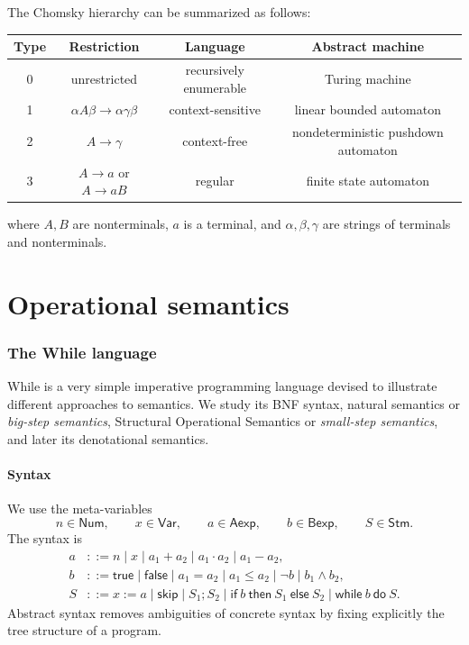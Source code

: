 \documentclass[a4paper]{article}
\newcommand{\Stm}{\mathsf{Stm}}
\newcommand{\Aexp}{\mathsf{Aexp}}
\newcommand{\Bexp}{\mathsf{Bexp}}
\newcommand{\Num}{\mathsf{Num}}
\newcommand{\Var}{\mathsf{Var}}
\newcommand{\skipc}{\mathsf{skip}}
\begin{document}
The Chomsky hierarchy can be summarized as follows:
\begin{center}
\begin{tabular}{c|c|c|c}
Type & Restriction & Language & Abstract machine \\
\hline
0 & unrestricted & recursively enumerable & Turing machine \\
1 & \(\alpha A\beta\to\alpha\gamma\beta\) & context-sensitive & linear bounded automaton \\
2 & \(A\to\gamma\) & context-free & nondeterministic pushdown automaton \\
3 & \(A\to a\) or \(A\to aB\) & regular & finite state automaton
\end{tabular}
\end{center}
where \(A,B\) are nonterminals, \(a\) is a terminal, and \(\alpha,\beta,\gamma\) are strings of terminals and nonterminals.

\pagebreak
\part{Operational semantics}

\section{The While language}

While is a very simple imperative programming language devised to illustrate different approaches to semantics.
We study its BNF syntax, natural semantics or \emph{big-step semantics}, Structural Operational Semantics or \emph{small-step semantics}, and later its denotational semantics.

\subsection{Syntax}

We use the meta-variables
\[
    n\in\Num,
    \qquad
    x\in\Var,
    \qquad
    a\in\Aexp,
    \qquad
    b\in\Bexp,
    \qquad
    S\in\Stm.
\]
The syntax is
\begin{align*}
    a &::= n \mid x \mid a_1+a_2 \mid a_1\cdot a_2 \mid a_1-a_2,\\
    b &::= \mathsf{true}\mid\mathsf{false}\mid a_1=a_2\mid a_1\leq a_2
        \mid \neg b \mid b_1\land b_2,\\
    S &::= x:=a \mid \skipc \mid S_1;S_2
        \mid \mathsf{if}\ b\ \mathsf{then}\ S_1\ \mathsf{else}\ S_2
        \mid \mathsf{while}\ b\ \mathsf{do}\ S.
\end{align*}
Abstract syntax removes ambiguities of concrete syntax by fixing explicitly the tree structure of a program.
\end{document}
